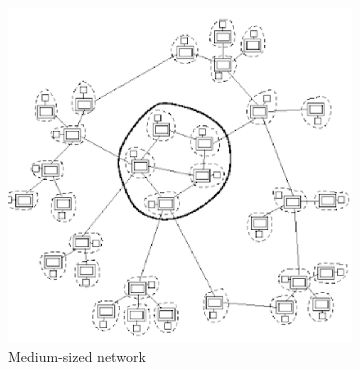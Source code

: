 \begin{figure}
\begin{subfigure}[t]{0.33\textwidth}
        \includegraphics[width=\linewidth]{resource/img/ch_automation/from_ares_paper/net_med_2.png}
        \caption{Medium-sized network\cite{Cowie_Ogielski_Nicol_2002}}
        \label{fig:refnet_med}
    \end{subfigure}
     \begin{subfigure}[t]{0.3\textwidth}
        \centering

\end{subfigure}
\end{figure}

